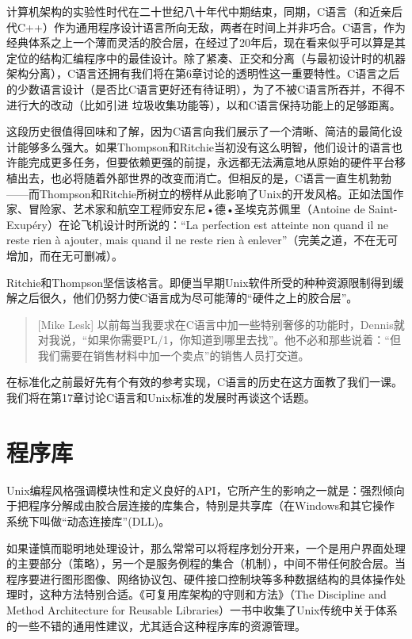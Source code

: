 \documentclass[12pt,oneside]{book}
\begin{document}
计算机架构的实验性时代在二十世纪八十年代中期结束，同期，C语言（和近亲后代C++）作为通用程序设计语言所向无敌，两者在时间上并非巧合。C语言，作为经典体系之上一个薄而灵活的胶合层，在经过了20年后，现在看来似乎可以算是其定位的结构汇编程序中的最佳设计。除了紧凑、正交和分离（与最初设计时的机器架构分离），C语言还拥有我们将在第6章讨论的透明性这一重要特性。C语言之后的少数语言设计（是否比C语言更好还有待证明），为了不被C语言所吞并，不得不进行大的改动（比如引进
垃圾收集功能等），以和C语言保持功能上的足够距离。

这段历史很值得回味和了解，因为C语言向我们展示了一个清晰、简洁的最简化设计能够多么强大。如果Thompson和Ritchie当初没有这么明智，他们设计的语言也许能完成更多任务，但要依赖更强的前提，永远都无法满意地从原始的硬件平台移植出去，也必将随着外部世界的改变而消亡。但相反的是，C语言一直生机勃勃——而Thompson和Ritchie所树立的榜样从此影响了Unix的开发风格。正如法国作家、冒险家、艺术家和航空工程师安东尼•德•圣埃克苏佩里（Antoine de Saint-Exupéry）在论飞机设计时所说的：“La perfection est atteinte non quand il ne reste rien à ajouter, mais quand il ne reste
rien à enlever”（完美之道，不在无可增加，而在无可删减）。

Ritchie和Thompson坚信该格言。即便当早期Unix软件所受的种种资源限制得到缓解之后很久，他们仍努力使C语言成为尽可能薄的“硬件之上的胶合层”。

\begin{quote}[Mike Lesk]
以前每当我要求在C语言中加一些特别奢侈的功能时，Dennis就对我说，“如果你需要PL/1，你知道到哪里去找”。他不必和那些说着：“但我们需要在销售材料中加一个卖点”的销售人员打交道。
\end{quote}

在标准化之前最好先有个有效的参考实现，C语言的历史在这方面教了我们一课。我们将在第17章讨论C语言和Unix标准的发展时再谈这个话题。


\section{程序库}
Unix编程风格强调模块性和定义良好的API，它所产生的影响之一就是：强烈倾向于把程序分解成由胶合层连接的库集合，特别是共享库（在Windows和其它操作系统下叫做“动态连接库”(DLL)。

如果谨慎而聪明地处理设计，那么常常可以将程序划分开来，一个是用户界面处理的主要部分（策略），另一个是服务例程的集合（机制），中间不带任何胶合层。当程序要进行图形图像、网络协议包、硬件接口控制块等多种数据结构的具体操作处理时，这种方法特别合适。《可复用库架构的守则和方法》（The Discipline and Method Architecture for Reusable Libraries）\cite{Vo}一书中收集了Unix传统中关于体系的一些不错的通用性建议，尤其适合这种程序库的资源管理。
\end{document}
